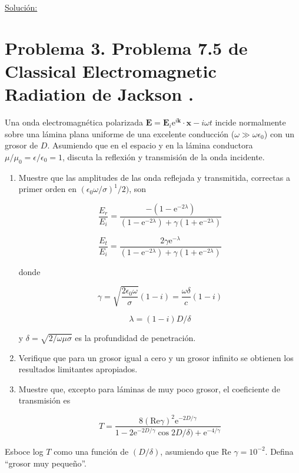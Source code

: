 \documentclass[a4paper,11pt]{article}
\numberwithin{equation}{section}
\newcommand{\euler}{\mathrm{e}}
\begin{document}
\vspace{.3cm}

\underline{Solución:} \vspace{.3cm}

\newpage

\section{Problema 3. Problema 7.5 de Classical Electromagnetic Radiation
de Jackson \cite{jackson}.}

Una onda electromagnética polarizada $\mathbf{E} = \mathbf{E}_i \euler^{i\mathbf{k}} 
\cdot \mathbf{x} - i\omega t$ incide normalmente sobre una lámina plana uniforme 
de una excelente conducción ($\omega \gg \omega \epsilon_0$) con un grosor de $D$. 
Asumiendo que en el espacio y en la lámina conductora $\mu/\mu_0 = \epsilon/\epsilon_0 
= 1$, discuta la reflexión y transmisión de la onda incidente. 

\begin{enumerate}[label=\textbf{(\alph*)}]
 \item Muestre que las amplitudes de las onda reflejada y transmitida, correctas 
 a primer orden en $(\epsilon_0 \omega /\sigma)^1/2)$, son 
 
 $$
 \frac{E_r}{E_i} = \frac{-(1 - \euler^{-2\lambda})}{(1 - \euler^{-2\lambda}) 
 + \gamma(1 + \euler^{-2\lambda})}
 $$
 
  $$
 \frac{E_t}{E_i} = \frac{2\gamma \euler^{-\lambda}}{(1 - \euler^{-2\lambda}) 
 + \gamma(1 + \euler^{-2\lambda})}
 $$
 
 donde 
 
 $$
 \gamma = \sqrt{\frac{2\epsilon_0 \omega}{\sigma}}(1 - i) = \frac{\omega \delta}{c}
 (1 - i)
 $$
 
 $$
 \lambda = (1-i)D/\delta
 $$
 
  y $\delta = \sqrt{2/\omega \mu \sigma}$ es la profundidad de penetración.
 
 \item Verifique que para un grosor igual a cero y un grosor infinito se obtienen 
 los resultados limitantes apropiados.
 \item Muestre que, excepto para láminas de muy poco grosor, el coeficiente de 
 transmisión es 
 
 $$
 T = \frac{8(\text{Re} \gamma)^2 \euler^{-2D/\gamma}}{1 - 2\euler^{-2D/\gamma} 
 \cos{2D/\delta) + \euler^{-4/\gamma}}}
 $$
\end{enumerate}

Esboce log $T$ como una función de $(D/\delta)$, asumiendo que Re $\gamma = 10^{-2}$. 
Defina ``grosor muy pequeño''.
\end{document}
